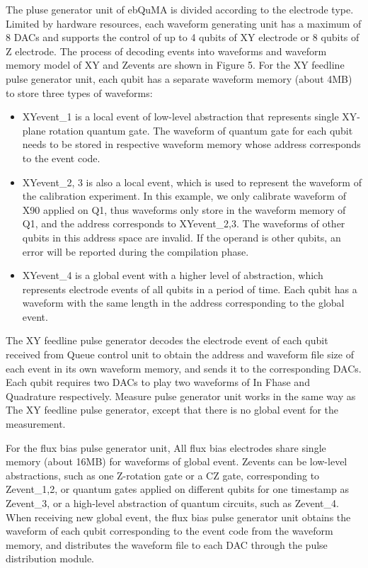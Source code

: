 The pluse generator unit of ebQuMA is divided according to the electrode type. Limited by hardware resources, 
each waveform generating unit has a maximum of 8 DACs and supports the control of up to 4 qubits of XY electrode or 8 qubits of Z electrode.
The process of decoding events into waveforms and waveform memory model of XY and Zevents are shown in Figure 5. For the XY feedline pulse generator unit, 
each qubit has a separate waveform memory (about 4MB) to store three types of waveforms:
\begin{itemize}
  \item XYevent\_1 is a local event of low-level abstraction that represents single XY-plane rotation quantum gate. 
  The waveform of quantum gate for each qubit needs to be stored in respective waveform memory whose address corresponds to the event code.
  \item XYevent\_2, 3 is also a local event, which is used to represent the waveform of the calibration experiment. 
  In this example, we only calibrate waveform of X90 applied on Q1, thus waveforms only store in the waveform memory of Q1, 
  and the address corresponds to XYevent\_2,3. The waveforms of other qubits in this address space are invalid. 
  If the operand is other qubits, an error will be reported during the compilation phase.
  \item XYevent\_4 is a global event with a higher level of abstraction, which represents electrode events of all qubits in a period of time. 
  Each qubit has a waveform with the same length in the address corresponding to the global event.
\end{itemize}
The XY feedline pulse generator decodes the electrode event of each qubit received from Queue control unit to obtain the address and waveform file size of each event in its own waveform memory, 
and sends it to the corresponding DACs. Each qubit requires two DACs to play two waveforms of In Fhase and Quadrature respectively. Measure pulse generator unit works in the same way as The XY feedline pulse generator, 
except that there is no global event for the measurement.

For the flux bias pulse generator unit, 
All flux bias electrodes share single memory (about 16MB) for waveforms of global event. 
Zevents can be low-level abstractions, such as one Z-rotation gate or a CZ gate, 
corresponding to Zevent\_1,2, or quantum gates applied on different qubits for one timestamp as Zevent\_3, 
or a high-level abstraction of quantum circuits, such as Zevent\_4. When receiving new global event, 
the flux bias pulse generator unit obtains the waveform of each qubit corresponding to the event code from the waveform memory, 
and distributes the waveform file to each DAC through the pulse distribution module.

